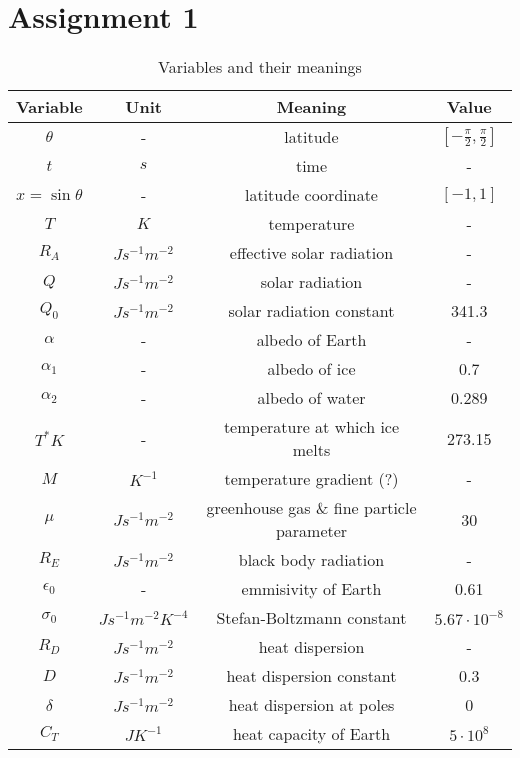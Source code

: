 \section{Assignment 1}

\begin{table}[H]
    \centering
    \begin{tabular}{|c|c|c|c|}
        \hline
        Variable & Unit &  Meaning & Value\\
        \hline
        $\theta$ & - & latitude & $[-\frac{\pi}{2}, \frac{\pi}{2}]$\\
        $t $ & $s$ & time & -\\
        $x = \sin \theta$ & -  & latitude coordinate & $[-1, 1]$\\
        $T $ & $K$ & temperature & -\\
        $R_A $ & $J s^{-1} m^{-2}$ & effective solar radiation & - \\
        $Q $ & $J s^{-1} m^{-2}$ & solar radiation & -\\
        $Q_0 $ & $J s^{-1} m^{-2}$ & solar radiation constant & 341.3\\
        $\alpha$ & - & albedo of Earth & -\\
        $\alpha_1$ & - & albedo of ice & 0.7\\
        $\alpha_2$ & - & albedo of water & 0.289\\
        $T^{*} K$ & - & temperature at which ice melts & 273.15\\
        $M$ & $K^{-1}$ & temperature gradient (?) & -\\
        $\mu $ & $J s^{-1} m^{-2}$ & greenhouse gas \& fine particle parameter & 30\\
        $R_E $ & $J s^{-1} m^{-2}$ & black body radiation & -\\
        $\epsilon_0$ & - & emmisivity of Earth & 0.61\\
        $\sigma_0 $ & $J s^{-1} m^{-2} K^{-4}$ & Stefan-Boltzmann constant & $5.67 \cdot 10^{-8}$\\
        $R_D $ & $J s^{-1} m^{-2}$ & heat dispersion & -\\
        $D $ & $J s^{-1} m^{-2}$ & heat dispersion constant & 0.3\\
        $\delta $ & $J s^{-1} m^{-2}$ & heat dispersion at poles & 0\\
        $C_T $ & $J K^{-1}$  & heat capacity of Earth & $5 \cdot 10^{8}$\\
        \hline
    \end{tabular}
    \caption{Variables and their meanings}
    \label{tab:vars}
\end{table}

